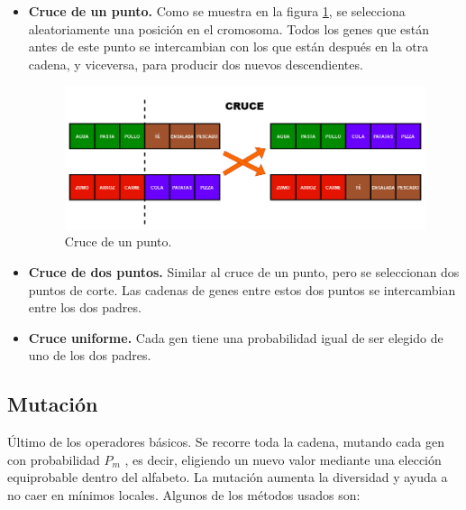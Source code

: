 \begin{itemize}
  \item \textbf{Cruce de un punto.} Como se muestra en la figura \ref{fig:cruce}, se selecciona aleatoriamente una posición en el cromosoma. Todos los genes que están antes de este punto se intercambian con los que están después en la otra cadena, y viceversa, para producir dos nuevos descendientes.
  
  \begin{figure}[H]
    \centering
    \includegraphics[width=1\textwidth]{figures/cruce.png}
    \caption{Cruce de un punto.}
    \label{fig:cruce}
  \end{figure}

  \item \textbf{Cruce de dos puntos.} Similar al cruce de un punto, pero se seleccionan dos puntos de corte. Las cadenas de genes entre estos dos puntos se intercambian entre los dos padres.
  \item \textbf{Cruce uniforme.} Cada gen tiene una probabilidad igual de ser elegido de uno de los dos padres.
\end{itemize}
\newpage
\subsection{Mutación}

Último de los operadores básicos. Se recorre toda la cadena, mutando cada gen con probabilidad \(P_m\) , es decir, eligiendo un nuevo valor mediante una elección equiprobable dentro del alfabeto. La mutación aumenta la diversidad y ayuda a no caer en mínimos locales. Algunos de los métodos usados son:

